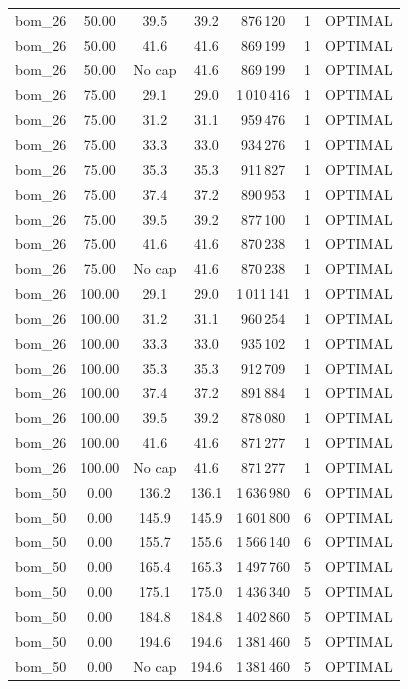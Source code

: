 \begin{longtable}{lcccccc}
bom\_26 & 50.00 & 39.5 & 39.2 & 876\,120 & 1 & OPTIMAL \\
bom\_26 & 50.00 & 41.6 & 41.6 & 869\,199 & 1 & OPTIMAL \\
bom\_26 & 50.00 & No cap & 41.6 & 869\,199 & 1 & OPTIMAL \\
bom\_26 & 75.00 & 29.1 & 29.0 & 1\,010\,416 & 1 & OPTIMAL \\
bom\_26 & 75.00 & 31.2 & 31.1 & 959\,476 & 1 & OPTIMAL \\
bom\_26 & 75.00 & 33.3 & 33.0 & 934\,276 & 1 & OPTIMAL \\
bom\_26 & 75.00 & 35.3 & 35.3 & 911\,827 & 1 & OPTIMAL \\
bom\_26 & 75.00 & 37.4 & 37.2 & 890\,953 & 1 & OPTIMAL \\
bom\_26 & 75.00 & 39.5 & 39.2 & 877\,100 & 1 & OPTIMAL \\
bom\_26 & 75.00 & 41.6 & 41.6 & 870\,238 & 1 & OPTIMAL \\
bom\_26 & 75.00 & No cap & 41.6 & 870\,238 & 1 & OPTIMAL \\
bom\_26 & 100.00 & 29.1 & 29.0 & 1\,011\,141 & 1 & OPTIMAL \\
bom\_26 & 100.00 & 31.2 & 31.1 & 960\,254 & 1 & OPTIMAL \\
bom\_26 & 100.00 & 33.3 & 33.0 & 935\,102 & 1 & OPTIMAL \\
bom\_26 & 100.00 & 35.3 & 35.3 & 912\,709 & 1 & OPTIMAL \\
bom\_26 & 100.00 & 37.4 & 37.2 & 891\,884 & 1 & OPTIMAL \\
bom\_26 & 100.00 & 39.5 & 39.2 & 878\,080 & 1 & OPTIMAL \\
bom\_26 & 100.00 & 41.6 & 41.6 & 871\,277 & 1 & OPTIMAL \\
bom\_26 & 100.00 & No cap & 41.6 & 871\,277 & 1 & OPTIMAL \\
bom\_50 & 0.00 & 136.2 & 136.1 & 1\,636\,980 & 6 & OPTIMAL \\
bom\_50 & 0.00 & 145.9 & 145.9 & 1\,601\,800 & 6 & OPTIMAL \\
bom\_50 & 0.00 & 155.7 & 155.6 & 1\,566\,140 & 6 & OPTIMAL \\
bom\_50 & 0.00 & 165.4 & 165.3 & 1\,497\,760 & 5 & OPTIMAL \\
bom\_50 & 0.00 & 175.1 & 175.0 & 1\,436\,340 & 5 & OPTIMAL \\
bom\_50 & 0.00 & 184.8 & 184.8 & 1\,402\,860 & 5 & OPTIMAL \\
bom\_50 & 0.00 & 194.6 & 194.6 & 1\,381\,460 & 5 & OPTIMAL \\
bom\_50 & 0.00 & No cap & 194.6 & 1\,381\,460 & 5 & OPTIMAL \\

\end{longtable}
